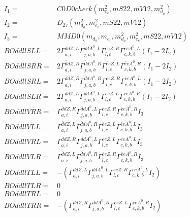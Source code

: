 \documentclass[A4,landscape]{article}
\begin{document}
\begin{align} 
I_1 = & C0D0check(m^2_{e_{{c}}}, mS22, mV12, m^2_{d_{{a}}}) \\ 
I_2 = & D_{27}(m^2_{d_{{a}}}, m^2_{e_{{c}}}, mS22, mV12) \\ 
I_3 = & MMD0(m_{d_{{a}}}, m_{e_{{c}}}, m^2_{d_{{a}}}, m^2_{e_{{c}}}, mS22, mV12) \\ 
  BOddllSLL= & 2  \Gamma^{\bar{d}d Z ,L}_{a, i} \Gamma^{\bar{d}d A^0 ,L}_{j, a, b} \Gamma^{\bar{e}e Z ,R}_{l, c} \Gamma^{\bar{e}e A^0 ,L}_{c, k, b} (I_1 - 2 I_2) \\ 
  BOddllSRR= & 2  \Gamma^{\bar{d}d Z ,R}_{a, i} \Gamma^{\bar{d}d A^0 ,R}_{j, a, b} \Gamma^{\bar{e}e Z ,L}_{l, c} \Gamma^{\bar{e}e A^0 ,R}_{c, k, b} (I_1 - 2 I_2) \\ 
  BOddllSRL= & 2  \Gamma^{\bar{d}d Z ,R}_{a, i} \Gamma^{\bar{d}d A^0 ,R}_{j, a, b} \Gamma^{\bar{e}e Z ,R}_{l, c} \Gamma^{\bar{e}e A^0 ,L}_{c, k, b} (I_1 - 2 I_2) \\ 
  BOddllSLR= & 2  \Gamma^{\bar{d}d Z ,L}_{a, i} \Gamma^{\bar{d}d A^0 ,L}_{j, a, b} \Gamma^{\bar{e}e Z ,L}_{l, c} \Gamma^{\bar{e}e A^0 ,R}_{c, k, b} (I_1 - 2 I_2) \\ 
  BOddllVRR= &  \Gamma^{\bar{d}d Z ,R}_{a, i} \Gamma^{\bar{d}d A^0 ,L}_{j, a, b} \Gamma^{\bar{e}e Z ,R}_{l, c} \Gamma^{\bar{e}e A^0 ,R}_{c, k, b} I_3 \\ 
  BOddllVLL= &  \Gamma^{\bar{d}d Z ,L}_{a, i} \Gamma^{\bar{d}d A^0 ,R}_{j, a, b} \Gamma^{\bar{e}e Z ,L}_{l, c} \Gamma^{\bar{e}e A^0 ,L}_{c, k, b} I_3 \\ 
  BOddllVRL= &  \Gamma^{\bar{d}d Z ,R}_{a, i} \Gamma^{\bar{d}d A^0 ,L}_{j, a, b} \Gamma^{\bar{e}e Z ,L}_{l, c} \Gamma^{\bar{e}e A^0 ,L}_{c, k, b} I_3 \\ 
  BOddllVLR= &  \Gamma^{\bar{d}d Z ,L}_{a, i} \Gamma^{\bar{d}d A^0 ,R}_{j, a, b} \Gamma^{\bar{e}e Z ,R}_{l, c} \Gamma^{\bar{e}e A^0 ,R}_{c, k, b} I_3 \\ 
  BOddllTLL= & -( \Gamma^{\bar{d}d Z ,L}_{a, i} \Gamma^{\bar{d}d A^0 ,L}_{j, a, b} \Gamma^{\bar{e}e Z ,R}_{l, c} \Gamma^{\bar{e}e A^0 ,L}_{c, k, b} I_2) \\ 
  BOddllTLR= & 0 \\ 
  BOddllTRL= & 0 \\ 
  BOddllTRR= & -( \Gamma^{\bar{d}d Z ,R}_{a, i} \Gamma^{\bar{d}d A^0 ,R}_{j, a, b} \Gamma^{\bar{e}e Z ,L}_{l, c} \Gamma^{\bar{e}e A^0 ,R}_{c, k, b} I_2) \\ 
\end{align} 
\end{document}
